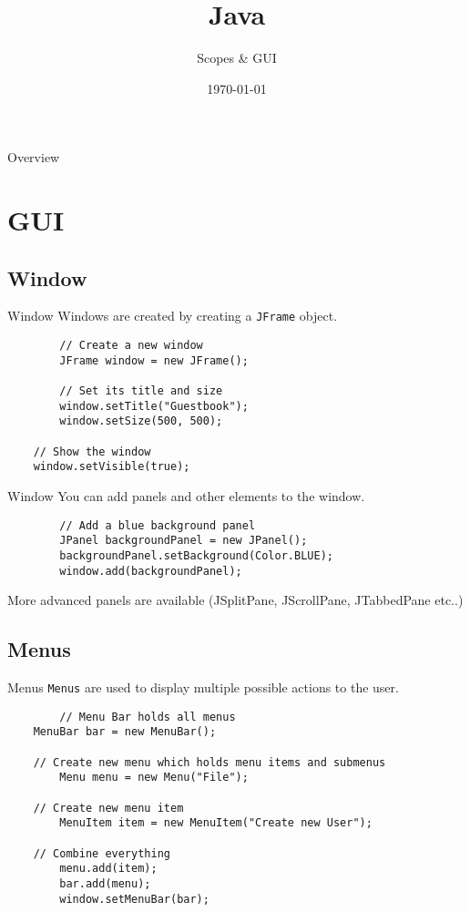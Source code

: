 


\title{Java}
\subtitle{Scopes \& GUI}
\date{\today}



\begin{frame}
\titlepage
\end{frame}

\begin{frame}{Overview}
\tableofcontents
\end{frame}

\section{GUI}
\subsection{Window}
\begin{frame}[fragile]{Window}
  Windows are created by creating a \texttt{JFrame} object.
	\begin{lstlisting}
		// Create a new window
		JFrame window = new JFrame();

		// Set its title and size
		window.setTitle("Guestbook");
		window.setSize(500, 500);
    
    // Show the window
    window.setVisible(true);
	\end{lstlisting}
\end{frame}

\begin{frame}[fragile]{Window}
  You can add panels and other elements to the window.
	\begin{lstlisting}
		// Add a blue background panel
		JPanel backgroundPanel = new JPanel();
		backgroundPanel.setBackground(Color.BLUE);
		window.add(backgroundPanel);
	\end{lstlisting}

  More advanced panels are available (JSplitPane, JScrollPane, JTabbedPane etc..)
\end{frame}

\subsection{Menus}
\begin{frame}[fragile]{Menus}
  \texttt{Menus} are used to display multiple possible actions to the user.
	\begin{lstlisting}
		// Menu Bar holds all menus
    MenuBar bar = new MenuBar();
    
    // Create new menu which holds menu items and submenus
		Menu menu = new Menu("File");

    // Create new menu item 
		MenuItem item = new MenuItem("Create new User");
    
    // Combine everything
		menu.add(item);
		bar.add(menu);
		window.setMenuBar(bar);
	\end{lstlisting}
\end{frame}

